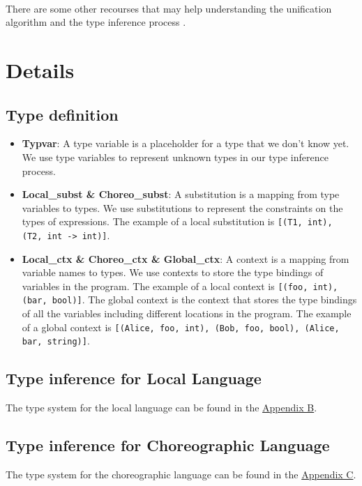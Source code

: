 \documentclass{article}
\begin{document}
    \paragraph{}
        There are some other recourses that may help understanding the unification algorithm and the type inference process  .

        \newpage %


\section{Details}
\subsection{Type definition}
    \begin{itemize}
        \item \textbf{Typvar}: A type variable is a placeholder for a type that we don't know yet. We use type variables to represent unknown types in our type inference process.
        \item \textbf{Local\_subst \& Choreo\_subst}: A substitution is a mapping from type variables to types. We use substitutions to represent the constraints on the types of expressions. The example of a local substitution is \texttt{[(T1, int), (T2, int -> int)]}.
        \item \textbf{Local\_ctx \& Choreo\_ctx \& Global\_ctx}: A context is a mapping from variable names to types. We use contexts to store the type bindings of variables in the program. The example of a local context is \texttt{[(foo, int), (bar, bool)]}. The global context is the context that stores the type bindings of all the variables including different locations in the program. The example of a global context is \texttt{[(Alice, foo, int), (Bob, foo, bool), (Alice, bar, string)]}.
    \end{itemize}

\subsection{Type inference for Local Language}
    The type system for the local language can be found in the \hyperref[appendix:local_typ]{Appendix B}.

\subsection{Type inference for Choreographic Language}
    The type system for the choreographic language can be found in the \hyperref[appendix:choreo_typ]{Appendix C}.
\end{document}
